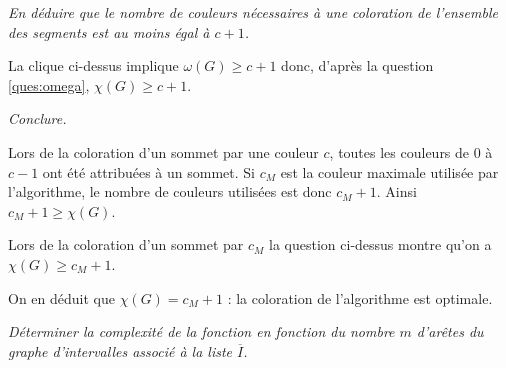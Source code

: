 \begin{Exercise}[label=ques:min]\it
En déduire que le nombre de couleurs nécessaires à une coloration de l'ensemble des segments est au moins égal à $c+1$.
\end{Exercise}  
\begin{Answer}

La clique ci-dessus implique $\omega(G) \ge c+1$ donc, d'après la question \ref{ques:omega}, $\chi(G) \ge c+1$.
\end{Answer}
\begin{Exercise}[label=ques:opt]\it
Conclure.
\end{Exercise}  
\begin{Answer}
Lors de la coloration d'un sommet par une couleur $c$, toutes les couleurs de 0 à $c-1$ ont été attribuées à un sommet.
Si $c_M$ est la couleur maximale utilisée par l'algorithme, le nombre de couleurs utilisées est donc $c_M+1$. 
Ainsi $c_M+1 \ge \chi(G)$.

Lors de la coloration d'un sommet par $c_M$ la question ci-dessus montre qu'on a  $\chi(G) \ge c_M+1$.

On en déduit que $\chi(G) = c_M+1$ : la coloration de l'algorithme est optimale.
\end{Answer}
\begin{Exercise}[title=Complexité]\it
Déterminer la complexité de la fonction  en fonction du nombre $m$ d'arêtes du graphe d'intervalles associé à la liste $\overline{I}$.
\end{Exercise}  
